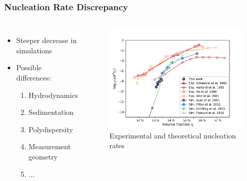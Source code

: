 \documentclass[smaller,notes=hide]{beamer}
\newlength{\wideitemsep}
\let\olditem\item
\renewcommand{\item}{\setlength{\itemsep}{\wideitemsep}\olditem}
\begin{document}
\begin{frame}
\frametitle{Nucleation Rate Discrepancy}
\begin{columns}
\begin{itemize}
\item Steeper decrease in simulations
\item Possible differences:
\begin{enumerate}
\item Hydrodynamics
\item Sedimentation
\item Polydispersity
\item Measurement geometry
\item ...
\end{enumerate}
\end{itemize}
\begin{figure}[h]
\centering
\includegraphics[width=1 \linewidth]{nucleation_comparison_v2.pdf}
\caption[]{Experimental and theoretical nucleation rates \cite{Harland1997,He1996,schaetzel1993,Sinn2001,Auer2001,Filion2010a,Fiorucci2020a,Schilling2011}}
\label{fig:nucleation_comparison}
\end{figure}
\end{columns}
\end{frame}
\end{document}
